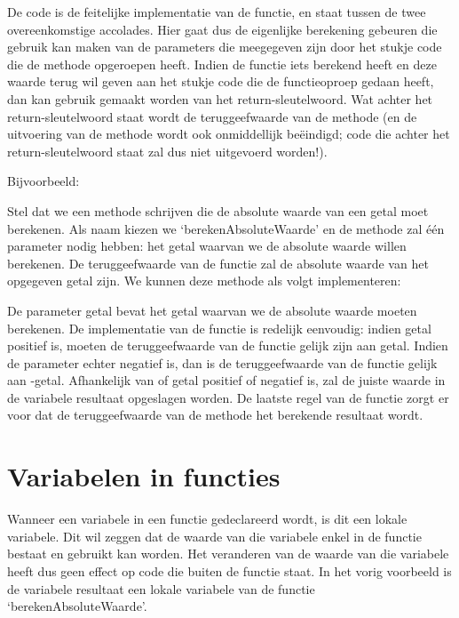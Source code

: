 
De code is de feitelijke implementatie van de functie, en staat tussen de twee overeenkomstige accolades. Hier gaat dus de eigenlijke berekening gebeuren die gebruik kan maken van de parameters die meegegeven zijn door het stukje code die de methode opgeroepen heeft. Indien de functie iets berekend heeft en deze waarde terug wil geven aan het stukje code die de functieoproep gedaan heeft, dan kan gebruik gemaakt worden van het return-sleutelwoord. Wat achter het return-sleutelwoord staat wordt de teruggeefwaarde van de methode (en de uitvoering van de methode wordt ook onmiddellijk be\"eindigd; code die achter het return-sleutelwoord staat zal dus niet uitgevoerd worden!).

Bijvoorbeeld:


Stel dat we een methode schrijven die de absolute waarde van een getal moet berekenen. Als naam kiezen we `berekenAbsoluteWaarde' en de methode zal \'e\'en parameter nodig hebben: het getal waarvan we de absolute waarde willen berekenen. De teruggeefwaarde van de functie zal de absolute waarde van het opgegeven getal zijn. We kunnen deze methode als volgt implementeren:


De parameter getal bevat het getal waarvan we de absolute waarde moeten berekenen. De implementatie van de functie is redelijk eenvoudig: indien getal positief is, moeten de teruggeefwaarde van de functie gelijk zijn aan getal. Indien de parameter echter negatief is, dan is de teruggeefwaarde van de functie gelijk aan -getal. Afhankelijk van of getal positief of negatief is, zal de juiste waarde in de variabele resultaat opgeslagen worden. De laatste regel van de functie zorgt er voor dat de teruggeefwaarde van de methode het berekende resultaat wordt.

\section{Variabelen in functies}

Wanneer een variabele in een functie gedeclareerd wordt, is dit een lokale variabele. Dit wil zeggen dat de waarde van die variabele enkel in de functie bestaat en gebruikt kan worden. Het veranderen van de waarde van die variabele heeft dus geen effect op code die buiten de functie staat. In het vorig voorbeeld is de variabele resultaat een lokale variabele van de functie `berekenAbsoluteWaarde'.

